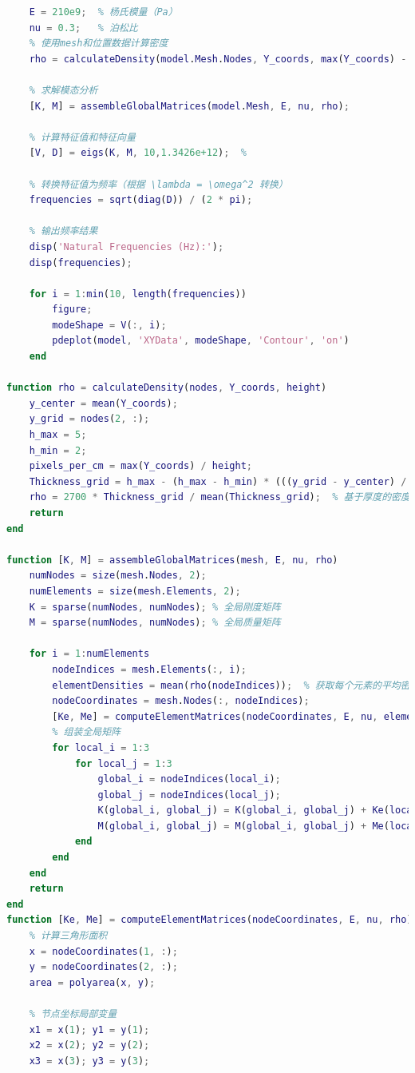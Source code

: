 \documentclass[withoutpreface,bwprint]{cumcmthesis} %
\begin{document}
\begin{appendices}
\begin{lstlisting}[language=matlab]
    % 材料属性
    E = 210e9;  % 杨氏模量（Pa）
    nu = 0.3;   % 泊松比
    % 使用mesh和位置数据计算密度
    rho = calculateDensity(model.Mesh.Nodes, Y_coords, max(Y_coords) - min(Y_coords));

    % 求解模态分析
    [K, M] = assembleGlobalMatrices(model.Mesh, E, nu, rho);

    % 计算特征值和特征向量
    [V, D] = eigs(K, M, 10,1.3426e+12);  %

    % 转换特征值为频率（根据 \lambda = \omega^2 转换）
    frequencies = sqrt(diag(D)) / (2 * pi);

    % 输出频率结果
    disp('Natural Frequencies (Hz):');
    disp(frequencies);

    for i = 1:min(10, length(frequencies))
        figure;
        modeShape = V(:, i);
        pdeplot(model, 'XYData', modeShape, 'Contour', 'on')
    end

function rho = calculateDensity(nodes, Y_coords, height)
    y_center = mean(Y_coords);
    y_grid = nodes(2, :);
    h_max = 5;
    h_min = 2;
    pixels_per_cm = max(Y_coords) / height;
    Thickness_grid = h_max - (h_max - h_min) * (((y_grid - y_center) / pixels_per_cm) / (height / 2)).^2;
    rho = 2700 * Thickness_grid / mean(Thickness_grid);  % 基于厚度的密度变化
    return
end

function [K, M] = assembleGlobalMatrices(mesh, E, nu, rho)
    numNodes = size(mesh.Nodes, 2);
    numElements = size(mesh.Elements, 2);
    K = sparse(numNodes, numNodes); % 全局刚度矩阵
    M = sparse(numNodes, numNodes); % 全局质量矩阵

    for i = 1:numElements
        nodeIndices = mesh.Elements(:, i);
        elementDensities = mean(rho(nodeIndices));  % 获取每个元素的平均密度
        nodeCoordinates = mesh.Nodes(:, nodeIndices);
        [Ke, Me] = computeElementMatrices(nodeCoordinates, E, nu, elementDensities);
        % 组装全局矩阵
        for local_i = 1:3
            for local_j = 1:3
                global_i = nodeIndices(local_i);
                global_j = nodeIndices(local_j);
                K(global_i, global_j) = K(global_i, global_j) + Ke(local_i, local_j);
                M(global_i, global_j) = M(global_i, global_j) + Me(local_i, local_j);
            end
        end
    end
    return
end
function [Ke, Me] = computeElementMatrices(nodeCoordinates, E, nu, rho)
    % 计算三角形面积
    x = nodeCoordinates(1, :);
    y = nodeCoordinates(2, :);
    area = polyarea(x, y);

    % 节点坐标局部变量
    x1 = x(1); y1 = y(1);
    x2 = x(2); y2 = y(2);
    x3 = x(3); y3 = y(3);


\end{lstlisting}
\end{appendices}
\end{document}
